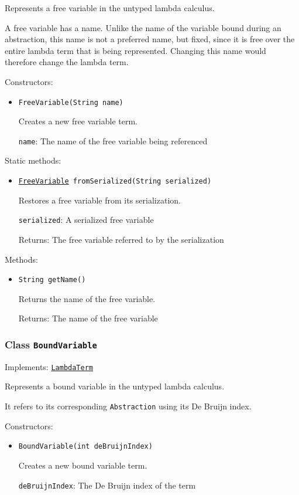 Represents a free variable in the untyped lambda calculus.
 
 A free variable has a name. Unlike the name of the variable bound during an
 abstraction, this name is not a preferred name, but fixed, since it is free
 over the entire lambda term that is being represented. Changing this name
 would therefore change the lambda term.

Constructors:
\begin{itemize}
\item \texttt{FreeVariable(String name)}

Creates a new free variable term.

\texttt{name}: The name of the free variable being referenced

\end{itemize}

Static methods:
\begin{itemize}
\item \texttt{\hyperref[type:edu.kit.wavelength.client.model.term.FreeVariable]{FreeVariable} fromSerialized(String serialized)}

Restores a free variable from its serialization.

\texttt{serialized}: A serialized free variable

Returns: The free variable referred to by the serialization

\end{itemize}

Methods:
\begin{itemize}
\item \texttt{String getName()}

Returns the name of the free variable.

Returns: The name of the free variable

\end{itemize}

\subsubsection{Class \texttt{BoundVariable}}
\label{type:edu.kit.wavelength.client.model.term.BoundVariable}
Implements: \texttt{\hyperref[type:edu.kit.wavelength.client.model.term.LambdaTerm]{LambdaTerm}}

Represents a bound variable in the untyped lambda calculus.
 
 It refers to its corresponding \texttt{Abstraction} using its De Bruijn index.

Constructors:
\begin{itemize}
\item \texttt{BoundVariable(int deBruijnIndex)}

Creates a new bound variable term.

\texttt{deBruijnIndex}: The De Bruijn index of the term

\end{itemize}

